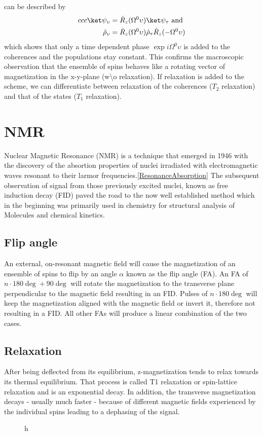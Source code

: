 		can be described by 
		\begin{equation}
			\begin{split}{ccc}
				\ket\psi_\upsilon &= \hat R_z(\Omega^0\upsilon)\ket\psi_\tau ~ \mathrm{and} \\
				\hat\rho_\upsilon &= \hat R_z(\Omega^0\upsilon)\hat\rho_\tau\hat
				R_z(-\Omega^0\upsilon)
			\end{split}
		\end{equation}
		which shows that only a time dependent phase $\exp{i\Omega^0 \upsilon}$ is added to the coherences and the populations
		stay constant. This confirms the macroscopic observation that the ensemble of spins behaves like a rotating vector of
		magnetization in the x-y-plane (w\textbackslash o relaxation).
		If relaxation is added to the scheme, we can differentiate between relaxation of the
		coherences ($T_2$ relaxation) and that of the states ($T_1$ relaxation).
	\section{NMR}
	Nuclear Magnetic Resonance (NMR) is a technique that emerged in 1946 with the discovery
	of the absortion properties of nuclei irradiated with electromagnetic waves resonant to their
	larmor frequencies.\ref{ResonanceAbsorption} The subsequent observation of signal from those
	previously excited nuclei, known as free induction decay (FID) paved the road to the now well
	established method which in the beginning was primarily used in chemistry for structural
	analysis of Molecules and chemical kinetics.
		\subsection{Flip angle}
			An external, on-resonant magnetic field will cause the magnetization of an ensemble of
			spins to flip by an angle $\alpha$ known as the flip angle (FA). An FA of $n\cdot 180
			\deg + 90 \deg$ will rotate the magnetization to the transverse plane perpendicular to the magnetic field
			resulting in an FID. Pulses of $n\cdot 180 \deg$ will keep the magnetization aligned
			with the magnetic field or invert it, therefore not resulting in a FID. All other FAs
			will produce a linear combination of the two cases.
		\subsection{Relaxation}
			After being deflected from its equilibrium, z-magnetization tends to relax towards its
			thermal equilibrium. That process is called T1 relaxation or spin-lattice relaxation and
			is an exponential decay. In addition, the transverse magnetization decays - usually much
			faster - because of different magnetic fields experienced by the individual spins
			leading to a dephasing of the signal.
			\begin{figure}{h}
			\end{figure}

